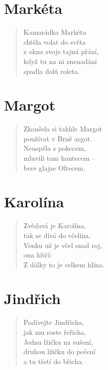 \section*{Markéta}
\begin{verse}
Kamarádka Markéta\\
chtěla volat do světa\\
z okna svoje tajná přání,\\
když tu na ni znenadání\\
spadla dolů roleta.
\end{verse}    

\section*{Margot}
\begin{verse}
Zkoušela si takhle Margot\\
používat v Brně argot.\\
Neuspěla s pokecem,\\
mluvili tam hantecem --\\
bere glajze Oltecem.
\end{verse}    

\section*{Karolína}
\begin{verse}
Zvědavá je Karolína,\\
tak se dívá do včelína.\\
Venku už je včel snad roj,\\
ona křičí: \\
Z dálky to je celkem hlína.
\end{verse}   
 
\section*{Jindřich}
\begin{verse}
Podívejte Jindřicha,\\
jak mu roste řeřicha.\\
Jednu lžičku na sušení,\\
druhou lžičku do pečení\\
a tu třetí do břicha.
\end{verse}    

